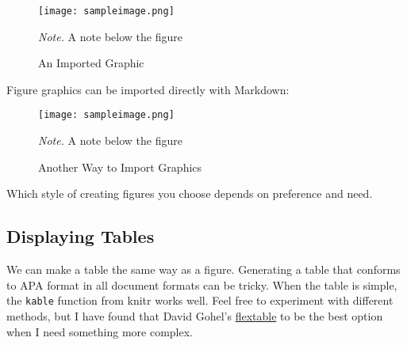 \documentclass[
  man,
  longtable,
  nolmodern,
  notxfonts,
  notimes,
  colorlinks=true,linkcolor=blue,citecolor=blue,urlcolor=blue]{apa7}
\begin{document}
\begin{figure}[!htbp]

{\caption{{An Imported Graphic}{\label{fig-import1}}}}

\texttt{[image: sampleimage.png]}

{\noindent \emph{Note.} A note below the figure}

\end{figure}

Figure graphics can be imported directly with Markdown:

\begin{figure}[!htbp]

{\caption{{Another Way to Import Graphics}{\label{fig-import2}}}}

\texttt{[image: sampleimage.png]}

{\noindent \emph{Note.} A note below the figure}

\end{figure}

Which style of creating figures you choose depends on preference and
need.

\subsection{Displaying Tables}\label{displaying-tables}

We can make a table the same way as a figure. Generating a table that
conforms to APA format in all document formats can be tricky. When the
table is simple, the \texttt{kable} function from knitr works well. Feel
free to experiment with different methods, but I have found that David
Gohel's \href{https://davidgohel.github.io/flextable/}{flextable} to be
the best option when I need something more complex.
\end{document}
